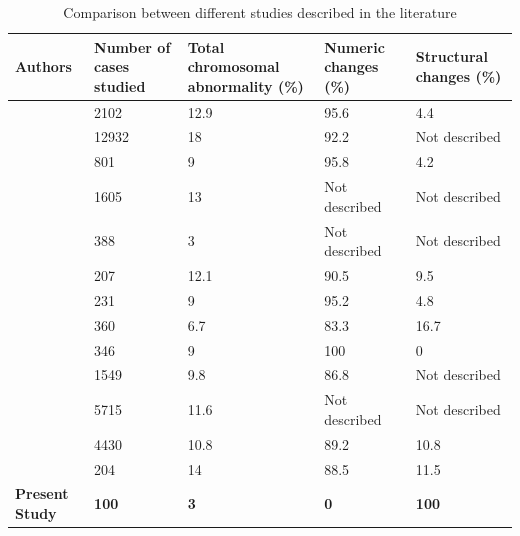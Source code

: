\begin{refsection}
\begin{landscape}
\renewcommand{\arraystretch}{1.3}
\begin{table}[!p]
\centering
\caption[Comparison between different studies described in the literature]{Comparison between different studies described in the literature}
\label{tab:3.2litreview}
\begin{tabular}{  P{1in} P{1in} P{2in} P{2in} P{2in}  }
\toprule
	\textbf{Authors} & \textbf{Number of cases studied} & \textbf{Total chromosomal abnormality (\%)} & \textbf{Numeric changes (\%)} & \textbf{Structural changes (\%)} \\ \toprule
	\cite{ferencz1989congenital} & 2102 & 12.9 & 95.6 & 4.4 \\ \midrule
	\cite{harris2003epidemiology} & 12932 & 18 & 92.2 & Not described \\ \midrule
	\cite{stoll1989risk} & 801 & 9 & 95.8 & 4.2 \\ \midrule
	\cite{pradat1992epidemiology} & 1605 & 13 & Not described & Not described \\ \midrule
	\cite{hanna1994genetic} & 388 & 3 & Not described & Not described \\ \midrule
	\cite{goodship1998population} & 207 & 12.1 & 90.5 & 9.5 \\ \midrule
	\cite{grech1999syndromes} & 231 & 9 & 95.2 & 4.8 \\ \midrule
	\cite{meberg2000outcome} & 360 & 6.7 & 83.3 & 16.7 \\ \midrule
	\cite{roodpeyma2002risk} & 346 & 9 & 100 & 0 \\ \midrule
	\cite{calzolari2003congenital} & 1549 & 9.8 & 86.8 & Not described \\ \midrule
	\cite{dadvand2009descriptive} & 5715 & 11.6 & Not described & Not described \\ \midrule
	\cite{hartman2011contribution} & 4430 & 10.8 & 89.2 & 10.8 \\ \midrule
	\cite{rosa2011trisomy} & 204 & 14 & 88.5 & 11.5 \\ \midrule
	\textbf{Present Study} & \textbf{100} & \textbf{3} & \textbf{0} & \textbf{100} \\ \bottomrule
\end{tabular}
\end{table}
\end{landscape}



\end{refsection}
